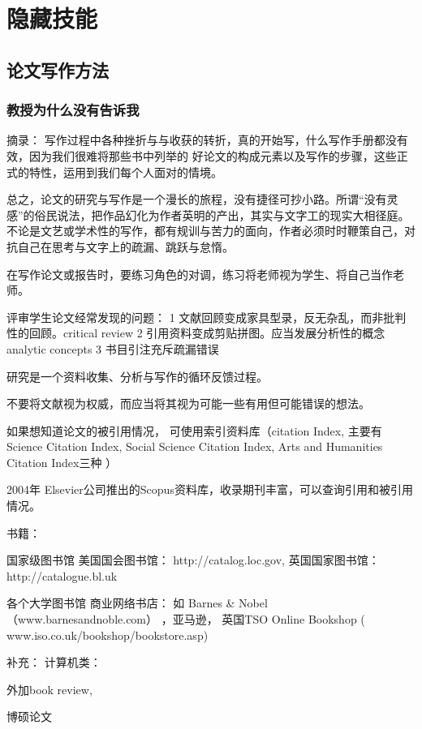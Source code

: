 \chapter{隐藏技能}


\section{论文写作方法}

\subsection{教授为什么没有告诉我}

摘录： 写作过程中各种挫折与与收获的转折，真的开始写，什么写作手册都没有效，因为我们很难将那些书中列举的
好论文的构成元素以及写作的步骤，这些正式的特性，运用到我们每个人面对的情境。

总之，论文的研究与写作是一个漫长的旅程，没有捷径可抄小路。所谓“没有灵感”的俗民说法，把作品幻化为作者英明的产出，其实与文字工的现实大相径庭。不论是文艺或学术性的写作，都有规训与苦力的面向，作者必须时时鞭策自己，对抗自己在思考与文字上的疏漏、跳跃与怠惰。


在写作论文或报告时，要练习角色的对调，练习将老师视为学生、将自己当作老师。

评审学生论文经常发现的问题：
1  文献回顾变成家具型录，反无杂乱，而非批判性的回顾。critical review
2  引用资料变成剪贴拼图。应当发展分析性的概念   analytic concepts
3 书目引注充斥疏漏错误

研究是一个资料收集、分析与写作的循环反馈过程。

不要将文献视为权威，而应当将其视为可能一些有用但可能错误的想法。

如果想知道论文的被引用情况， 可使用索引资料库（citation Index, 主要有 Science Citation Index, Social Science Citation Index, Arts and Humanities Citation Index三种 ）


2004年 Elsevier公司推出的Scopus资料库，收录期刊丰富，可以查询引用和被引用情况。

书籍：

国家级图书馆
美国国会图书馆： http://catalog.loc.gov, 
英国国家图书馆： http://catalogue.bl.uk

各个大学图书馆
商业网络书店： 如 Barnes \& Nobel（www.barnesandnoble.com）   ，亚马逊，
英国TSO Online Bookshop ( www.iso.co.uk/bookshop/bookstore.asp)

补充： 计算机类：

外加book review, 

博硕论文

